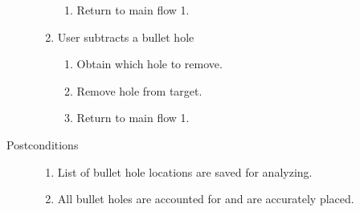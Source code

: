 \begin{description}
\begin{enumerate}
\begin{enumerate}
                    \item Return to main flow 1.
                \end{enumerate}
            \item User subtracts a bullet hole
                \begin{enumerate}
                    \item Obtain which hole to remove.
                    \item Remove hole from target.
                    \item Return to main flow 1.
                \end{enumerate}
        \end{enumerate}
    \item[Postconditions]
        \begin{enumerate}
            \item List of bullet hole locations are saved for analyzing.
            \item All bullet holes are accounted for and are accurately placed.
        \end{enumerate}
\end{description}


